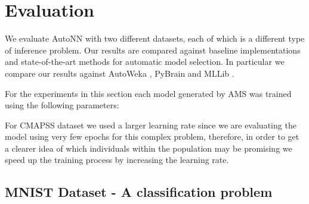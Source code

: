 \documentclass[journal]{IEEEtran}
\begin{document}
\section{Evaluation}
\label{sec:evaluation}

We evaluate AutoNN with two different datasets, each of which is a different type of inference problem. Our results are compared against baseline implementations and state-of-the-art methods for automatic model selection. In particular we compare our results against AutoWeka \cite{Thornton2016}, PyBrain \cite{Schaul2010} and MLLib \cite{mlib2017}.

For the experiments in this section each model generated by AMS was trained using the following parameters:

\begin{table}[!htb]
\begin{center}
\end{center}
\caption{Training parameters for each of the used datasets.}
\label{table:training_params}
\end{table}

For CMAPSS dataset we used a larger learning rate since we are evaluating the model using very few epochs for this complex problem, therefore, in order to get a clearer idea of which individuals within the population may be promising we speed up the training process by increasing the learning rate.

\subsection{MNIST Dataset - A classification problem}
\end{document}
